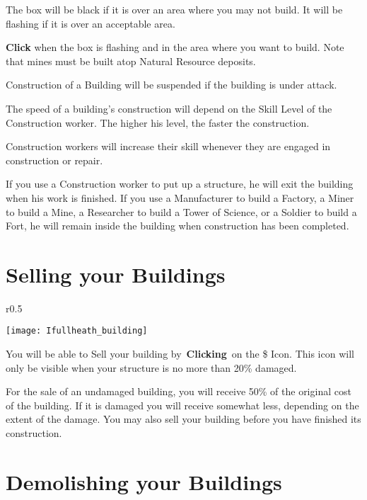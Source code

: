The box will be black if it is over an area where you may not build. It will be flashing if it is over an acceptable area.

\textbf{Click} when the box is flashing and in the area where you want to build. Note that mines must be built atop Natural Resource deposits. 

Construction of a Building will be suspended if the building is under attack.

The speed of a building’s construction will depend on the Skill Level of the Construction worker. The higher his level, the faster the construction.

Construction workers will increase their skill whenever they are engaged in construction or repair.

If you use a Construction worker to put up a structure, he will exit the building when his work is finished. If you use a Manufacturer to build a Factory, a Miner to build a Mine, a Researcher to build a Tower of Science, or a Soldier to build a Fort, he will remain inside the building when construction has been completed.

\section{Selling your Buildings}


\begin{wrapfigure}{r}{0.5\textwidth}
	\vspace{-20pt}
	\begin{center}
		\texttt{[image: Ifullheath\_building]}
	\end{center}
	\vspace{-20pt}
\end{wrapfigure}

You will be able to Sell your building by \textbf{Clicking} on the \$ Icon. This icon will only be visible when your structure is no more than 20\% damaged.

For the sale of an undamaged building, you will receive 50\% of the original cost of the building. If it is damaged you will receive somewhat less, depending on the extent of the damage. You may also sell your building before you have finished its construction.

\section{Demolishing your Buildings}

